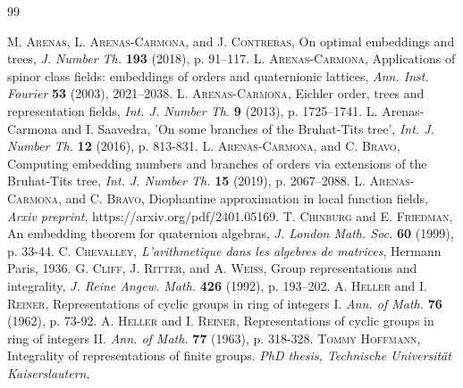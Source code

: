 \documentclass{article}
\theoremstyle{definition}
\theoremstyle{remark}
\begin{document}
\begin{thebibliography}{99}

   
    \textsc{M. Arenas}, \textsc{L. Arenas-Carmona}, and 
    \textsc{J. Contreras}, On optimal embeddings and trees,
    \textit{J. Number Th.} \textbf{193} (2018), p. 91–117.
     \textsc{L. Arenas-Carmona}, Applications of spinor class fields: embeddings of orders and quaternionic lattices, 
     \textit{Ann. Inst. Fourier} \textbf{53} (2003), 2021–2038.
     \textsc{L. Arenas-Carmona}, Eichler order, trees and representation 
     fields, \textit{Int. J. Number Th.} \textbf{9} (2013), p. 1725–1741.
     {\sc L. Arenas-Carmona} and {\sc I. Saavedra}, 
     'On some branches of the Bruhat-Tits tree',  
     {\em Int. J. Number Th.} \textbf{12} (2016), p. 813-831.
    \textsc{L. Arenas-Carmona}, and \textsc{C. Bravo}, Computing 
    embedding numbers and branches of orders via extensions of the
    Bruhat-Tits tree, \textit{Int. J. Number Th.} \textbf{15} (2019), 
    p. 2067–2088.
    \textsc{L. Arenas-Carmona}, and \textsc{C. Bravo}, Diophantine approximation in local function fields, 
    \textit{Arxiv preprint}, 
    https://arxiv.org/pdf/2401.05169.
    \textsc{T. Chinburg} and \textsc{E. Friedman}, 
    An embedding theorem for quaternion algebras, 
    \textit{J. London Math. Soc.} \textbf{60} (1999), p. 33-44.
    \textsc{C. Chevalley}, 
    \textit{L'arithmetique dans les algebres de matrices}, 
    Hermann Paris, 1936.
    \textsc{G. Cliff}, \textsc{J. Ritter}, and \textsc{A. Weiss}, 
    Group representations and integrality, \textit{J. Reine Angew. Math.} 
    \textbf{426} (1992), p. 193–202.
    \textsc{A. Heller} and \textsc{I. Reiner}, Representations of cyclic 
    groups in ring of integers I. \textit{Ann. of Math.} 
    \textbf{76} (1962), p. 73-92.
    \textsc{A. Heller} and \textsc{I. Reiner}, Representations of cyclic 
    groups in ring of integers II. \textit{Ann. of Math.} \textbf{77}
    (1963), p. 318-328.
    \textsc{Tommy Hoffmann}, Integrality of representations of finite 
    groups. \textit{PhD thesis, Technische Universit\"at Kaiserslautern}, 

\end{thebibliography}
\end{document}
